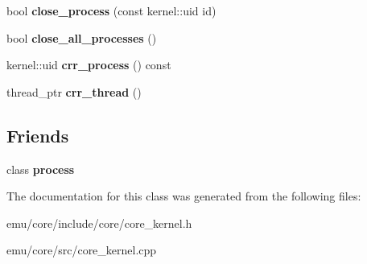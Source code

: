 \begin{DoxyCompactItemize}
\item 
\mbox{\label{classeka2l1_1_1kernel__system_a030bc2facd31f78115862dc4b068e2bf}} 
bool {\bfseries close\+\_\+process} (const kernel\+::uid id)
\item 
\mbox{\label{classeka2l1_1_1kernel__system_ae1c26222d79ac1d38686648faaea506b}} 
bool {\bfseries close\+\_\+all\+\_\+processes} ()
\item 
\mbox{\label{classeka2l1_1_1kernel__system_a94d4ffc0964adcb455b5cc786bb926cc}} 
kernel\+::uid {\bfseries crr\+\_\+process} () const
\item 
\mbox{\label{classeka2l1_1_1kernel__system_af4244a6164c1111628a335efe4c046c3}} 
thread\+\_\+ptr {\bfseries crr\+\_\+thread} ()
\end{DoxyCompactItemize}
\subsection*{Friends}
\begin{DoxyCompactItemize}
\item 
\mbox{\label{classeka2l1_1_1kernel__system_a45826c4d3572efe010737f69d31d0a7c}} 
class {\bfseries process}
\end{DoxyCompactItemize}


The documentation for this class was generated from the following files\+:\begin{DoxyCompactItemize}
\item 
emu/core/include/core/core\+\_\+kernel.\+h\item 
emu/core/src/core\+\_\+kernel.\+cpp\end{DoxyCompactItemize}
